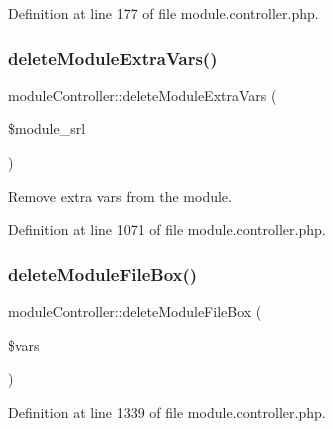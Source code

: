 Definition at line 177 of file module.\+controller.\+php.

\hypertarget{classmoduleController_aff9b45ce153dcad735896f56fe60516f}{}\label{classmoduleController_aff9b45ce153dcad735896f56fe60516f} 
\subsubsection{\texorpdfstring{delete\+Module\+Extra\+Vars()}{deleteModuleExtraVars()}}
{\footnotesize\ttfamily module\+Controller\+::delete\+Module\+Extra\+Vars (\begin{DoxyParamCaption}\item[{}]{\$module\+\_\+srl }\end{DoxyParamCaption})}



Remove extra vars from the module. 



Definition at line 1071 of file module.\+controller.\+php.

\hypertarget{classmoduleController_a26ff8a052af05f873237f3023e3e1bde}{}\label{classmoduleController_a26ff8a052af05f873237f3023e3e1bde} 
\subsubsection{\texorpdfstring{delete\+Module\+File\+Box()}{deleteModuleFileBox()}}
{\footnotesize\ttfamily module\+Controller\+::delete\+Module\+File\+Box (\begin{DoxyParamCaption}\item[{}]{\$vars }\end{DoxyParamCaption})}



Definition at line 1339 of file module.\+controller.\+php.

\hypertarget{classmoduleController_a34f1a44321986a8f4692be393d6a5c85}{}\label{classmoduleController_a34f1a44321986a8f4692be393d6a5c85} 
